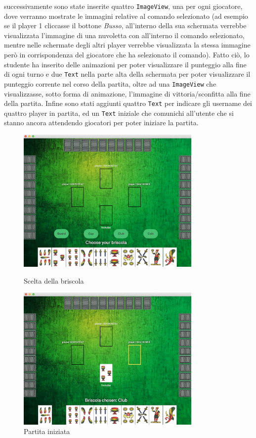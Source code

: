 \begin{itemize}
successivamente sono state inserite quattro \texttt{ImageView}, una per ogni giocatore, dove verranno mostrate le immagini relative al comando selezionato (ad esempio se il player 1 cliccasse il bottone \textit{Busso}, all'interno della sua schermata verrebbe visualizzata l'immagine di una nuvoletta con all'interno il comando selezionato, mentre nelle schermate degli altri player verrebbe visualizzata la stessa immagine però in corrispondenza del giocatore che ha selezionato il comando). Fatto ciò, lo studente ha inserito delle animazioni per poter visualizzare il punteggio alla fine di ogni turno e due \texttt{Text} nella parte alta della schermata per poter visualizzare il punteggio corrente nel corso della partita, oltre ad una \texttt{ImageView} che visualizzasse, sotto forma di animazione, l'immagine di vittoria/sconfitta alla fine della partita. Infine sono stati aggiunti quattro \texttt{Text} per indicare gli username dei quattro player in partita, ed un \texttt{Text} iniziale che comunichi all'utente che si stanno ancora attendendo giocatori per poter iniziare la partita.
	
	\clearpage
	
	\begin{figure}[h!]
  	\centering
   	 \includegraphics[width=0.8\textwidth]{playGameView1.png}
    	\caption{Scelta della briscola}
   	 \includegraphics[width=0.8\textwidth]{playGameView2.png}
 	 \caption{Partita iniziata}
	\end{figure}
	
	\end{itemize}
     
